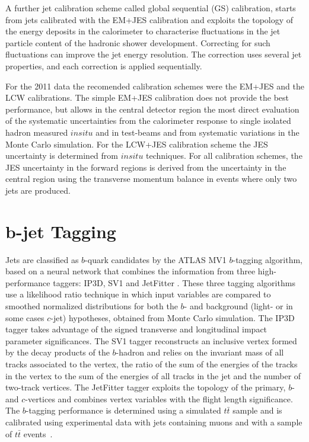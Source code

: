 \begin{itemize}
A further jet calibration scheme called global sequential (GS) calibration, starts from jets calibrated with the EM+JES calibration and exploits the topology of the energy deposits in the calorimeter to characterise fluctuations in the jet particle content of the hadronic shower development.  Correcting for such fluctuations can improve the jet energy resolution. The correction uses several jet properties, and each correction is applied sequentially.


For the 2011 data the recomended calibration schemes were the EM+JES and the LCW calibrations. The simple EM+JES calibration does not provide the best performance, but allows in the central detector region the most direct evaluation of the systematic uncertainties from the calorimeter response to single isolated hadron measured $in situ$ and in test-beams and from systematic variations in the Monte Carlo simulation.  For the LCW+JES calibration scheme the JES uncertainty is determined from $in situ$ techniques. For all calibration schemes, the JES uncertainty in the forward regions is derived from the uncertainty in the central region using the transverse momentum balance in events where only two jets are produced. 


\section{ $\bm b$-jet Tagging}\label{sec:btagging}


Jets are classified as $b$-quark candidates by the ATLAS MV1 $b$-tagging algorithm, based on a neural network that combines the information from three high-performance taggers: IP3D, SV1 and JetFitter \cite{ATLAS-CONF-2011-102}.  These three tagging algorithms use a likelihood ratio technique in which input variables are compared to smoothed normalized distributions for both the $b$- and background (light- or in some cases $c$-jet) hypotheses, obtained from Monte Carlo simulation.  The IP3D tagger takes advantage of the signed transverse and longitudinal impact parameter significances. The SV1 tagger reconstructs an inclusive vertex formed by the decay products of the $b$-hadron and relies on the invariant mass of all tracks associated to the vertex, the ratio of the sum of the energies of the tracks in the vertex to the sum of the energies of all tracks in the jet and the number of two-track vertices. The JetFitter tagger exploits the topology of the primary, $b$- and $c$-vertices and combines vertex variables with the flight length significance.  The $b$-tagging performance is determined using a simulated $t\bar{t}$ sample and is calibrated using experimental data with jets containing muons and with a sample of $t\bar{t}$ events~\cite{ATLAS-CONF-2011-089}.




\end{itemize}
